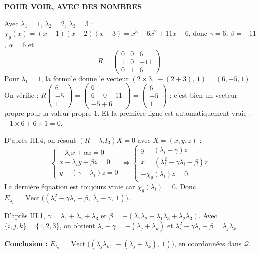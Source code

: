 \documentclass[a4paper,11pt]{article}
\numberwithin{equation}{section}
\numberwithin{figure}{section}
\numberwithin{table}{section}
\theoremstyle{enonce}
\theoremstyle{exemple}
\theoremstyle{remarque}
\newcommand{\vect}{\operatorname{Vect}}
\newcommand{\Qc}{\mathcal Q}
\newcommand{\Exemple}[1]{\begin{exemplebox}{\sffamily\bfseries\footnotesize\color{Ocre}POUR VOIR, AVEC DES NOMBRES}\par\smallskip #1\end{exemplebox}}
\begin{document}
\Exemple{Avec $\lambda_1=1$, $\lambda_2=2$, $\lambda_3=3$ : $\chi_g(x)=(x-1)(x-2)(x-3)=x^3-6x^2+11x-6$, donc $\gamma=6$,
$\beta=-11$, $\alpha=6$ et
\[R=\begin{pmatrix}0&0&6\\1&0&-11\\0&1&6\end{pmatrix}.\]
Pour $\lambda_1=1$, la formule donne le vecteur $(2\times3,\,-(2+3),\,1)=(6,-5,1)$. On vérifie :
$R\begin{pmatrix}6\\-5\\1\end{pmatrix}=\begin{pmatrix}6\\6+0-11\\-5+6\end{pmatrix}=\begin{pmatrix}6\\-5\\1\end{pmatrix}$ : c'est bien un
vecteur propre pour la valeur propre $1$. Et la première ligne est automatiquement vraie : $-1\times6+6\times1=0$.}

\begin{copie}
D'après III.4, on résout $(R-\lambda_iI_3)X=0$ avec $X=(x,y,z)$ :
\[\begin{cases}-\lambda_ix+\alpha z=0\\ x-\lambda_iy+\beta z=0\\ y+(\gamma-\lambda_i)z=0\end{cases}
\iff\begin{cases}y=(\lambda_i-\gamma)z\\ x=(\lambda_i^2-\gamma\lambda_i-\beta)z\\ -\chi_g(\lambda_i)z=0.\end{cases}\]
La dernière équation est toujours vraie car $\chi_g(\lambda_i)=0$. Donc
$E_{\lambda_i}=\vect\big((\lambda_i^2-\gamma\lambda_i-\beta,\ \lambda_i-\gamma,\ 1)\big)$.

D'après III.1, $\gamma=\lambda_1+\lambda_2+\lambda_3$ et $\beta=-(\lambda_1\lambda_2+\lambda_1\lambda_3+\lambda_2\lambda_3)$. Avec
$\{i,j,k\}=\{1,2,3\}$, on obtient $\lambda_i-\gamma=-(\lambda_j+\lambda_k)$ et $\lambda_i^2-\gamma\lambda_i-\beta=\lambda_j\lambda_k$.

\textbf{Conclusion :} $E_{\lambda_i}=\vect\big((\lambda_j\lambda_k,\ -(\lambda_j+\lambda_k),\ 1)\big)$, en coordonnées dans $\Qc$.
\end{copie}
\end{document}
